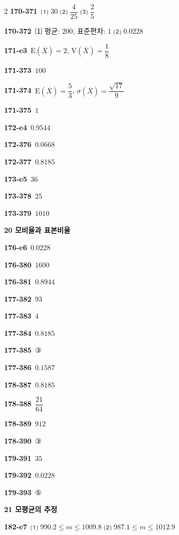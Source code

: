 \documentclass[10pt,a4paper]{article}
\begin{document}
\begin{multicols}{2}
\noindent\textbf{170-371}\ ⑴ $30$ ⑵ $\dfrac{4}{25}$ ⑶ $\dfrac{2}{5}$\par
\noindent\textbf{170-372}\ ⑴ 평균: $200$, 표준편차: $1$ ⑵ $0.0228$\par
\noindent\textbf{171-e3}\ $\mathrm{E}(\overline{X})=2$, $\mathrm{V}(\overline{X})=\dfrac{1}{8}$\par
\noindent\textbf{171-373}\ $100$\par
\noindent\textbf{171-374}\ $\mathrm{E}(\overline{X})=\dfrac{5}{3}$, $\sigma(\overline{X})=\dfrac{\sqrt{17}}{9}$\par
\noindent\textbf{171-375}\ $1$\par
\noindent\textbf{172-e4}\ $0.9544$\par
\noindent\textbf{172-376}\ $0.0668$\par
\noindent\textbf{172-377}\ $0.8185$\par
\noindent\textbf{173-e5}\ $36$\par
\noindent\textbf{173-378}\ $25$\par
\noindent\textbf{173-379}\ $1010$\par
\noindent\textbf{20 모비율과 표본비율}\par\smallskip
\noindent\textbf{176-e6}\ $0.0228$\par
\noindent\textbf{176-380}\ $1600$\par
\noindent\textbf{176-381}\ $0.8944$\par
\noindent\textbf{177-382}\ $93$\par
\noindent\textbf{177-383}\ $4$\par
\noindent\textbf{177-384}\ $0.8185$\par
\noindent\textbf{177-385}\ ③\par
\noindent\textbf{177-386}\ $0.1587$\par
\noindent\textbf{178-387}\ $0.8185$\par
\noindent\textbf{178-388}\ $\dfrac{21}{64}$\par
\noindent\textbf{178-389}\ $912$\par
\noindent\textbf{178-390}\ ③\par
\noindent\textbf{179-391}\ $35$\par
\noindent\textbf{179-392}\ $0.0228$\par
\noindent\textbf{179-393}\ ⑤\par
\noindent\textbf{21 모평균의 추정}\par\smallskip
\noindent\textbf{182-e7}\ ⑴ $990.2\le m\le 1009.8$ ⑵ $987.1\le m\le 1012.9$\par

\end{multicols}
\end{document}
